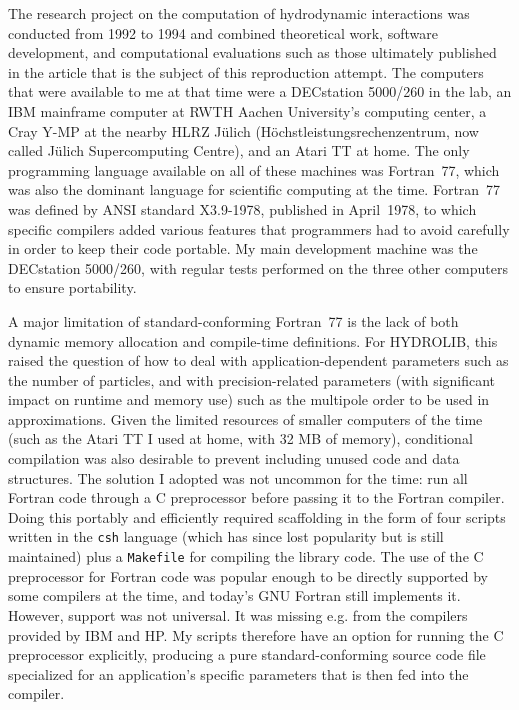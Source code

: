 The research project on the computation of hydrodynamic interactions was conducted from 1992 to 1994 and combined theoretical work, software development, and computational evaluations such as those ultimately published in the article that is the subject of this reproduction attempt. The computers that were available to me at that time were a DECstation 5000/260 in the lab, an IBM mainframe computer at RWTH Aachen University's computing center, a Cray Y-MP at the nearby HLRZ Jülich (Höchstleistungsrechenzentrum, now called Jülich Supercomputing Centre), and an Atari TT at home. The only programming language available on all of these machines was Fortran~77, which was also the dominant language for scientific computing at the time. Fortran~77 was defined by ANSI standard X3.9-1978, published in April~1978, to which specific compilers added various features that programmers had to avoid carefully in order to keep their code portable. My main development machine was the DECstation 5000/260, with regular tests performed on the three other computers to ensure portability.

A major limitation of standard-conforming Fortran~77 is the lack of both dynamic memory allocation and compile-time definitions. For HYDROLIB, this raised the question of how to deal with application-dependent parameters such as the number of particles, and with precision-related parameters (with significant impact on runtime and memory use) such as the multipole order to be used in approximations. Given the limited resources of smaller computers of the time (such as the Atari TT I used at home, with 32 MB of memory), conditional compilation was also desirable to prevent including unused code and data structures. The solution I adopted was not uncommon for the time: run all Fortran code through a C preprocessor before passing it to the Fortran compiler. Doing this portably and efficiently required scaffolding in the form of four scripts written in the \texttt{csh} language (which has since lost popularity but is still maintained) plus a \texttt{Makefile} for compiling the library code. The use of the C preprocessor for Fortran code was popular enough to be directly supported by some compilers at the time, and today's GNU Fortran still implements it. However, support was not universal. It was missing e.g. from the compilers provided by IBM and HP. My scripts therefore have an option for running the C preprocessor explicitly, producing a pure standard-conforming source code file specialized for an application's specific parameters that is then fed into the compiler.

